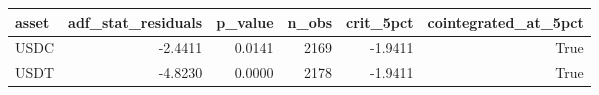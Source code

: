 \begin{tabular}{lrrrrr}
\toprule
asset & adf_stat_residuals & p_value & n_obs & crit_5pct & cointegrated_at_5pct \\
\midrule
USDC & -2.4411 & 0.0141 & 2169 & -1.9411 & True \\
USDT & -4.8230 & 0.0000 & 2178 & -1.9411 & True \\
\bottomrule
\end{tabular}
